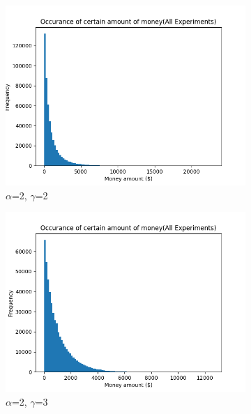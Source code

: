 \documentclass[12pt]{article} %
\begin{document}
\begin{figure}[h!]
\begin{subfigure}{\scaleTextWidth\textwidth}
		\includegraphics[scale=\scaleResultsA]{a2g1.png} %
		\caption{$\alpha$=2, $\gamma$=2}
		\label{fig:a2g2}
	\end{subfigure}
	\begin{subfigure}{\scaleTextWidth\textwidth}
		\includegraphics[scale=\scaleResultsA]{a2g3.png}
		\caption{$\alpha$=2, $\gamma$=3}
		\label{fig:a2g3}
	\end{subfigure}
	\begin{subfigure}{\scaleTextWidth\textwidth}

\end{subfigure}
\end{figure}
\end{document}
